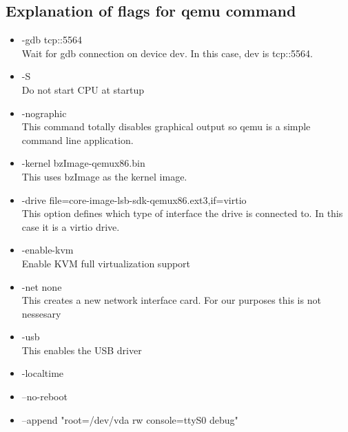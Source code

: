 \documentclass[letterpaper,10pt,titlepage,draftclsnofoot,onecolumn]{IEEEtran}
\begin{document}
\subsection{Explanation of flags for qemu command}
\begin{itemize}
\item -gdb tcp::5564 \\
Wait for gdb connection on device dev. In this case, dev is tcp::5564.
\item -S \\
Do not start CPU at startup
\item -nographic \\
This command totally disables graphical output so qemu is a simple command line application. 
\item -kernel bzImage-qemux86.bin \\
This uses bzImage as the kernel image.
\item -drive file=core-image-lsb-sdk-qemux86.ext3,if=virtio \\
This option defines which type of interface the drive is connected to. In this case it is a virtio drive. 
\item -enable-kvm \\
Enable KVM full virtualization support
\item -net none \\
This creates a new network interface card. For our purposes this is not nessesary
\item -usb \\ 
This enables the USB driver
\item -localtime \\ 
\item --no-reboot \\
\item --append "root=/dev/vda rw console=ttyS0 debug" \\
\end{itemize}

\end{document}
